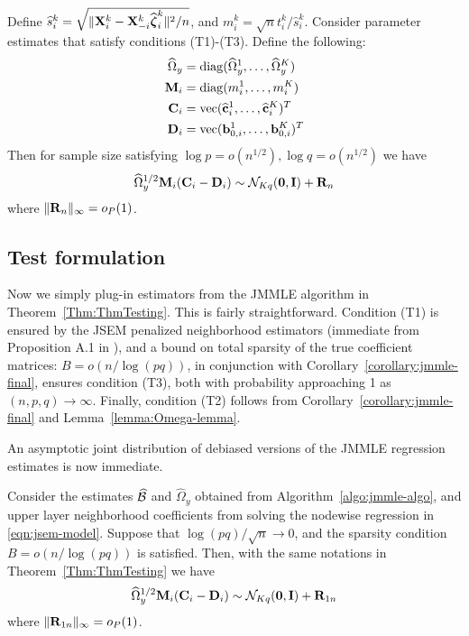 \begin{Theorem}\label{Thm:ThmTesting}
Define $\widehat s_i^k = \sqrt{\| {\mathbf{X}}_i^k - {\mathbf{X}}_{-i}^k \widehat {{\boldsymbol{\zeta}}}_i^k \|^2/n}$, and $m_i^k = \sqrt n t_i^k / \widehat s_i^k$. Consider parameter estimates that satisfy conditions (T1)-(T3). Define the following:
%
\begin{align*}
\widehat \Omega_y &= \operatorname*{diag}(\widehat \Omega_y^1, \ldots, \widehat \Omega_y^K)\\
{\mathbf{M}}_i &= \operatorname*{diag}(m_i^1, \ldots, m_i^K)\\
{\mathbf{C}}_i &= \operatorname*{vec}(\widehat {{\bf{c}}}_i^1, \ldots, \widehat {{\bf{c}}}_i^K)^T\\
{\mathbf{D}}_i &= \operatorname*{vec}({\bf{b}}_{0,i}^1, \ldots, {\bf{b}}_{0,i}^K)^T\\
\end{align*}
%
Then for sample size satisfying $\log p = o(n^{1/2}), \log q = o(n^{1/2})$ we have
%
\begin{align}\label{eqn:ThmTestingEqn}
\widehat \Omega_y^{1/2} {\mathbf{M}}_i ({\mathbf{C}}_i - {\mathbf{D}}_i) \sim
{\cal{N}}_{Kq} ({\bf 0}, {\mathbf{I}}) + {\mathbf{R}}_n
\end{align}
%
where $\| {\mathbf{R}}_n \|_\infty = o_P(1)$.
\end{Theorem}
%

\subsection{Test formulation}
\label{sec:testing-subsec-2}
Now we simply plug-in estimators from the JMMLE algorithm in Theorem~\ref{Thm:ThmTesting}. This is fairly straightforward. Condition (T1) is ensured by the JSEM penalized neighborhood estimators (immediate from Proposition A.1 in \cite{MaMichailidis15}), and a bound on total sparsity of the true coefficient matrices: $B = o(n/ \log(pq))$, in conjunction with Corollary~\ref{corollary:jmmle-final}, ensures condition (T3), both with probability approaching 1 as $(n,p,q) \rightarrow \infty$. Finally, condition (T2) follows from Corollary~\ref{corollary:jmmle-final} and Lemma~\ref{lemma:Omega-lemma}.

An asymptotic joint distribution of debiased versions of the JMMLE regression estimates is now immediate.
%
\begin{Corollary}\label{corollary:CorTesting}
Consider the estimates $\widehat {{\cal{B}}}$ and $\widehat \Omega_y $ obtained from Algorithm~\ref{algo:jmmle-algo}, and upper layer neighborhood coefficients from solving the nodewise regression in \eqref{eqn:jsem-model}. Suppose that $\log (pq) /\sqrt n \rightarrow 0$, and the sparsity condition $B = o(n / \log(pq))$ is satisfied. Then, with the same notations in Theorem~\ref{Thm:ThmTesting} we have
%
\begin{align}\label{eqn:CorTestingEqn}
\widehat \Omega_y^{1/2} {\mathbf{M}}_i ({\mathbf{C}}_i - {\mathbf{D}}_i) \sim
{\cal{N}}_{Kq} ({\bf 0}, {\mathbf{I}}) + {\mathbf{R}}_{1n}
\end{align}
%
where $\| {\mathbf{R}}_{1n} \|_\infty = o_P(1)$.
\end{Corollary}

